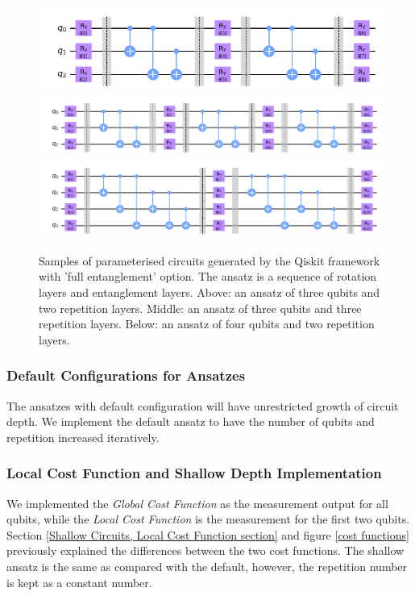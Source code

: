 \begin{figure}
    \includegraphics[width=\textwidth]{Artefact/Appendices/ansatz3-2.png}
    \includegraphics[width=\textwidth]{Artefact/Appendices/ansatz3-3.png}
    \includegraphics[width=\textwidth]{Artefact/Appendices/ansatz4-2.png}
    \caption{
        Samples of parameterised circuits generated by the Qiskit framework with 'full entanglement' option.
        The ansatz is a sequence of rotation layers and entanglement layers.
        Above: an ansatz of three qubits and two repetition layers.
        Middle: an ansatz of three qubits and three repetition layers.
        Below: an ansatz of four qubits and two repetition layers.
    }
    \label{Ansatz samples}
\end{figure}

\subsubsection{Default Configurations for Ansatzes}
The ansatzes with default configuration will have unrestricted growth of circuit depth.
We implement the default ansatz to have the number of qubits and repetition increased iteratively.

\subsubsection{Local Cost Function and Shallow Depth Implementation}
We implemented the \textit{Global Cost Function} as the measurement output for all qubits, while the \textit{Local Cost Function} is the measurement for the first two qubits.
Section \ref{Shallow Circuits, Local Cost Function section} and figure \ref{cost functions} previously explained the differences between the two cost functions.
The shallow ansatz is the same as compared with the default, however, the repetition number is kept as a constant number.

